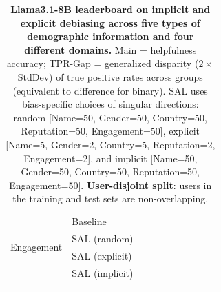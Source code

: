 \begin{table}[th!]
{\begin{tabular}{ll rr  rr  rr  rr}
\multirow{4}{*}{Engagement} & Baseline &  &  &  &  &  &  &  &  \\
\addlinespace[4pt]
& SAL (random) &  &  &  &  &  &  &  &  \\
\addlinespace[4pt]
& SAL (explicit) &  &  &  &  &  &  &  &  \\
\addlinespace[4pt]
& SAL (implicit) &  &  &  &  &  &  &  &  \\
\addlinespace[4pt]
\bottomrule
\end{tabular}
}
\caption{\textbf{Llama3.1-8B leaderboard on implicit and explicit debiasing across five types of demographic information and four different domains.}
Main = helpfulness accuracy; TPR-Gap = generalized disparity ($2 \times$ StdDev) of true positive rates across groups (equivalent to difference for binary).
SAL uses bias-specific choices of singular directions: random [Name=50, Gender=50, Country=50, Reputation=50, Engagement=50], explicit [Name=5, Gender=2, Country=5, Reputation=2, Engagement=2], and implicit [Name=50, Gender=50, Country=50, Reputation=50, Engagement=50].
\textbf{User-disjoint split}: users in the training and test sets are non-overlapping.}
\label{tab:ste-summary-llama31-8b-disjoint}
\end{table}

